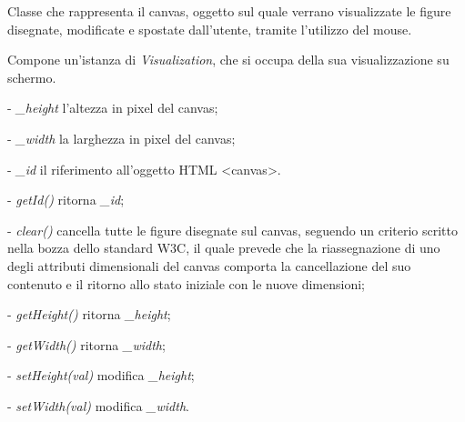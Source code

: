 Classe che rappresenta il canvas, oggetto sul quale verrano visualizzate le figure disegnate, modificate e spostate dall'utente, tramite l'utilizzo del mouse. 

Compone un'istanza di \textit{Visualization}, che si occupa della sua visualizzazione su schermo.
\begin{elencopuntato}[\subsubsecindent]
\item[-] \textit{{\_}height} l'altezza in pixel del canvas;
\item[-] \textit{{\_}width} la larghezza in pixel del canvas;
\item[-] \textit{{\_}id} il riferimento all'oggetto HTML <canvas>.
\end{elencopuntato}
\begin{elencopuntato}[\subsubsecindent]
\item[-] \textit{getId()} ritorna  \textit{{\_}id};
\item[-] \textit{clear()} cancella tutte le figure disegnate sul canvas, seguendo un criterio scritto nella bozza dello standard W3C, il quale prevede che la riassegnazione di uno degli attributi dimensionali del canvas comporta la cancellazione del suo contenuto e il ritorno allo stato iniziale con le nuove dimensioni;
\item[-] \textit{getHeight()} ritorna  \textit{{\_}height};
\item[-] \textit{getWidth()} ritorna  \textit{{\_}width};
\item[-] \textit{setHeight(val)} modifica \textit{{\_}height};
\item[-] \textit{setWidth(val)} modifica \textit{{\_}width}.
\end{elencopuntato}

